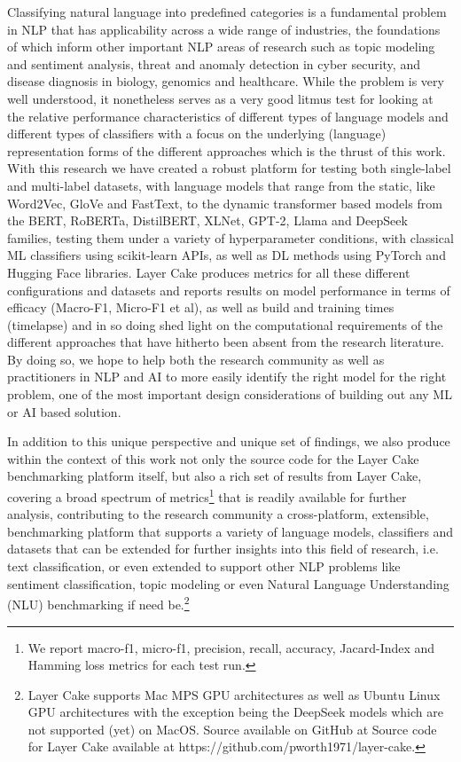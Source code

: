 \documentclass[final]{clv2025}
\begin{document}
Classifying natural language into predefined categories is a fundamental problem in NLP that has applicability across a wide range of industries, the foundations of which inform other important NLP areas of research such as topic modeling and sentiment analysis, threat and anomaly detection in cyber security, and disease diagnosis in biology, genomics and healthcare. While the problem is very well understood, it nonetheless serves as a very good litmus test for looking at the relative performance characteristics of different types of language models and different types of classifiers with a focus on the underlying (language) representation forms of the different approaches which is the thrust of this work. With this research we have created a robust platform for testing both single-label and multi-label datasets, with language models that range from the static, like Word2Vec, GloVe and FastText, to the dynamic transformer based models from the BERT, RoBERTa, DistilBERT, XLNet, GPT-2, Llama and DeepSeek families, testing them under a variety of hyperparameter conditions, with classical ML classifiers using scikit-learn APIs, as well as DL methods using PyTorch and Hugging Face libraries. Layer Cake produces metrics for all these different configurations and datasets and reports results on model performance in terms of efficacy (Macro-F1, Micro-F1 et al), as well as build and training times (timelapse) and in so doing shed light on the computational requirements of the different approaches that have hitherto been absent from the research literature. By doing so, we hope to help both the research community as well as practitioners in NLP and AI to more easily identify the right model for the right problem, one of the most important design considerations of building out any ML or AI based solution.

In addition to this unique perspective and unique set of findings, we also produce within the context of this work not only the source code for the Layer Cake benchmarking platform itself, but also a rich set of results from Layer Cake, covering a broad spectrum of metrics\footnote{We report macro-f1, micro-f1, precision, recall, accuracy, Jacard-Index and Hamming loss metrics for each test run.} that is readily available for further analysis, contributing to the research community a cross-platform, extensible, benchmarking platform that supports a variety of language models, classifiers and datasets that can be extended for further insights into this field of research, i.e. text classification, or even extended to support other NLP problems like sentiment classification, topic modeling or even Natural Language Understanding (NLU) benchmarking if need be.\footnote{Layer Cake supports Mac MPS GPU architectures as well as Ubuntu Linux GPU architectures with the exception being the DeepSeek models which are not supported (yet) on MacOS. Source available on GitHub at Source code for Layer Cake available at https://github.com/pworth1971/layer-cake.} 
\end{document}
